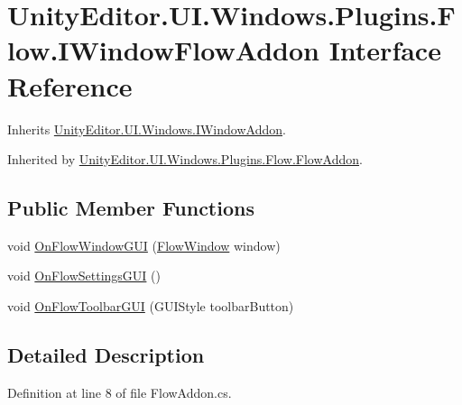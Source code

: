 \hypertarget{interface_unity_editor_1_1_u_i_1_1_windows_1_1_plugins_1_1_flow_1_1_i_window_flow_addon}{}\section{Unity\+Editor.\+U\+I.\+Windows.\+Plugins.\+Flow.\+I\+Window\+Flow\+Addon Interface Reference}
\label{interface_unity_editor_1_1_u_i_1_1_windows_1_1_plugins_1_1_flow_1_1_i_window_flow_addon}


Inherits \hyperlink{interface_unity_editor_1_1_u_i_1_1_windows_1_1_i_window_addon}{Unity\+Editor.\+U\+I.\+Windows.\+I\+Window\+Addon}.



Inherited by \hyperlink{class_unity_editor_1_1_u_i_1_1_windows_1_1_plugins_1_1_flow_1_1_flow_addon}{Unity\+Editor.\+U\+I.\+Windows.\+Plugins.\+Flow.\+Flow\+Addon}.

\subsection*{Public Member Functions}
\begin{DoxyCompactItemize}
\item 
void \hyperlink{interface_unity_editor_1_1_u_i_1_1_windows_1_1_plugins_1_1_flow_1_1_i_window_flow_addon_a9ca6a356792c358b2d7edbc3d9232187}{On\+Flow\+Window\+G\+U\+I} (\hyperlink{class_unity_engine_1_1_u_i_1_1_windows_1_1_plugins_1_1_flow_1_1_flow_window}{Flow\+Window} window)
\item 
void \hyperlink{interface_unity_editor_1_1_u_i_1_1_windows_1_1_plugins_1_1_flow_1_1_i_window_flow_addon_a6113a0d570cf46b598bdc0a3fcb799ae}{On\+Flow\+Settings\+G\+U\+I} ()
\item 
void \hyperlink{interface_unity_editor_1_1_u_i_1_1_windows_1_1_plugins_1_1_flow_1_1_i_window_flow_addon_afb56a6dded88882012b2813553c4b4cd}{On\+Flow\+Toolbar\+G\+U\+I} (G\+U\+I\+Style toolbar\+Button)
\end{DoxyCompactItemize}


\subsection{Detailed Description}


Definition at line 8 of file Flow\+Addon.\+cs.



